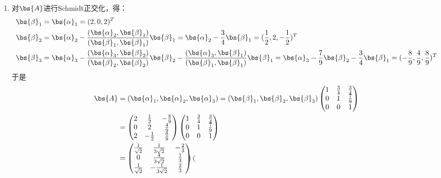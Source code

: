 \documentclass[12pt, a4paper, oneside, UTF8]{ctexbook}
\begin{document}
\begin{solution}
\begin{enumerate}[label=(\arabic*)]
        \item 对$\bs{A}$进行Schmidt正交化，得：
        \begin{align*}
            \bs{\beta}_1&=\bs{\alpha}_1=(2,0,2)^T\\
            \bs{\beta}_2&=\bs{\alpha}_2-\frac{(\bs{\alpha}_2,\bs{\beta}_1)}{(\bs{\beta}_1,\bs{\beta}_1)}\bs{\beta}_1
            =\bs{\alpha}_2-\frac{3}{4}\bs{\beta}_1=
            (\frac{1}{2},2,-\frac{1}{2})^T\\
            \bs{\beta}_3&=\bs{\alpha}_3
            -\frac{(\bs{\alpha}_3,\bs{\beta}_2)}{(\bs{\beta}_2,\bs{\beta}_2)}\bs{\beta}_2
            -\frac{(\bs{\alpha}_3,\bs{\beta}_1)}{(\bs{\beta}_1,\bs{\beta}_1)}\bs{\beta}_1
            =\bs{\alpha}_3-\frac{7}{9}\bs{\beta}_2-\frac{3}{4}\bs{\beta}_1=
            (-\frac{8}{9},\frac{4}{9},\frac{8}{9})^T
        \end{align*}
        于是
        \begin{align*}
            \bs{A}
            &=(\bs{\alpha}_1,\bs{\alpha}_2,\bs{\alpha}_3)
            =(\bs{\beta}_1,\bs{\beta}_2,\bs{\beta}_3)
            \begin{pmatrix}
                1 &\frac{3}{4}&\frac{3}{4}\\
                0 & 1&\frac{7}{9} \\
                0&0&1
            \end{pmatrix}\\
            &=\begin{pmatrix}
                2& \frac{1}{2} & -\frac{8}{9}\\
                0& 2& \frac{4}{9} \\
                2 & -\frac{1}{2} & \frac{8}{9}
            \end{pmatrix} 
            \begin{pmatrix}
                1 &\frac{3}{4}&\frac{3}{4}\\
                0 & 1&\frac{7}{9} \\
                0&0&1
            \end{pmatrix}\\
            &=\begin{pmatrix}
                \frac{1}{\sqrt{2}}& \frac{1}{3\sqrt{2}} & -\frac{2}{3}\\
                0& \frac{4}{3\sqrt{2}}& \frac{1}{3} \\
                \frac{1}{\sqrt{2}} & -\frac{1}{3\sqrt{2}}& \frac{2}{3}
            \end{pmatrix}
            \begin{pmatrix}

\end{pmatrix}
\end{align*}
\end{enumerate}
\end{solution}
\end{document}
